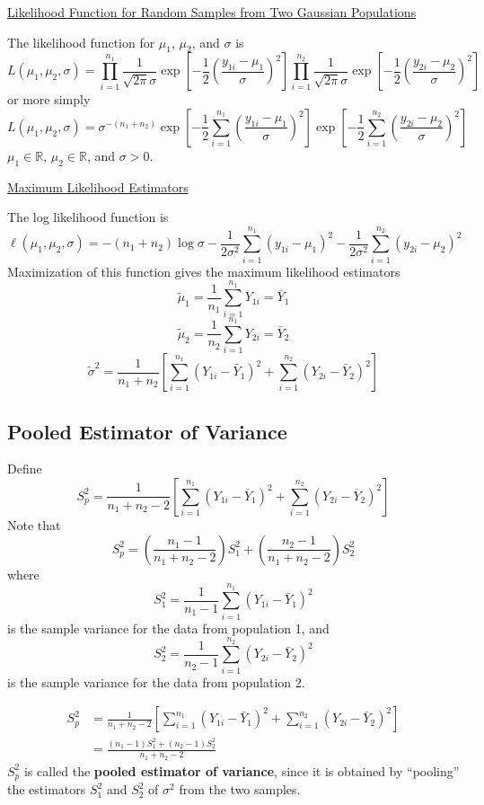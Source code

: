 \underline{Likelihood Function for Random Samples from Two Gaussian Populations}

The likelihood function for $ \mu_1 $, $ \mu_2 $, and $ \sigma $ is
\[L\left(\mu_{1}, \mu_{2}, \sigma\right)=\prod_{i=1}^{n_{1}} \frac{1}{\sqrt{2 \pi} \sigma} \exp \left[-\frac{1}{2}\left(\frac{y_{1 i}-\mu_{1}}{\sigma}\right)^{2}\right] \prod_{i=1}^{n_{2}} \frac{1}{\sqrt{2 \pi} \sigma}
    \exp \left[-\frac{1}{2}\left(\frac{y_{2 i}-\mu_{2}}{\sigma}\right)^{2}\right]\]
or more simply
\[L\left(\mu_{1}, \mu_{2}, \sigma\right)=\sigma^{-\left(n_{1}+n_{2}\right)} \exp \left[-\frac{1}{2} \sum_{i=1}^{n_{1}}\left(\frac{y_{1 i}-\mu_{1}}{\sigma}\right)^{2}\right]
    \exp \left[-\frac{1}{2} \sum_{i=1}^{n_{2}}\left(\frac{y_{2 i}-\mu_{2}}{\sigma}\right)^{2}\right]\]
$ \mu_1\in\mathbb{R} $, $ \mu_2\in\mathbb{R} $, and $ \sigma>0 $.

\underline{Maximum Likelihood Estimators}

The log likelihood function is
\[\ell\left(\mu_{1}, \mu_{2}, \sigma\right)=-\left(n_{1}+n_{2}\right) \log \sigma-\frac{1}{2 \sigma^{2}} \sum_{i=1}^{n_{1}}\left(y_{1 i}-\mu_{1}\right)^{2}
    -\frac{1}{2 \sigma^{2}} \sum_{i=1}^{n_{2}}\left(y_{2 i}-\mu_{2}\right)^{2}\]
Maximization of this function gives the maximum likelihood estimators
\[ \tilde{\mu}_1=\frac{1}{n_1} \sum\limits_{i=1}^{n_1} Y_{1i}=\bar{Y}_1 \]
\[ \tilde{\mu}_2=\frac{1}{n_2} \sum\limits_{i=1}^{n_1} Y_{2i}=\bar{Y}_2 \]
\[ \tilde{\sigma}^2=\frac{1}{n_1+n_2}\left[ \sum\limits_{i=1}^{n_1}
        \left( Y_{1i}-\bar{Y}_1 \right)^2+\sum\limits_{i=1}^{n_2}
        \left( Y_{2i}-\bar{Y}_2 \right)^2 \right]  \]


\subsection{Pooled Estimator of Variance}
Define
\[S_{p}^{2}=\frac{1}{n_{1}+n_{2}-2}\left[\sum_{i=1}^{n_{1}}\left(Y_{1 i}-\bar{Y}_{1}\right)^{2}+\sum_{i=1}^{n_{2}}\left(Y_{2 i}-\bar{Y}_{2}\right)^{2}\right]\]
Note that
\[S_{p}^{2}=\left(\frac{n_{1}-1}{n_{1}+n_{2}-2}\right) S_{1}^{2}+\left(\frac{n_{2}-1}{n_{1}+n_{2}-2}\right) S_{2}^{2}\]
where
\[S_{1}^{2}=\frac{1}{n_{1}-1} \sum_{i=1}^{n_{1}}\left(Y_{1 i}-\bar{Y}_{1}\right)^{2}\]
is the sample variance for the data from population 1, and
\[S_{2}^{2}=\frac{1}{n_{2}-1} \sum_{i=1}^{n_{2}}\left(Y_{2 i}-\bar{Y}_{2}\right)^{2}\]
is the sample variance for the data from population 2.

\begin{Definition}{}{}
    \[\begin{aligned}
            S_{p}^{2} & =\frac{1}{n_{1}+n_{2}-2}\left[\sum_{i=1}^{n_{1}}\left(Y_{1 i}-\bar{Y}_{1}\right)^{2}+\sum_{i=1}^{n_{2}}\left(Y_{2 i}-\bar{Y}_{2}\right)^{2}\right] \\
                      & =\frac{\left(n_{1}-1\right) S_{1}^{2}+\left(n_{2}-1\right) S_{2}^{2}}{n_{1}+n_{2}-2}
        \end{aligned}\]
    $ S_p^2 $ is called the \textbf{pooled estimator of variance}, since it is obtained by
    ``pooling'' the estimators $ S_1^2 $ and $ S_2^2 $ of $ \sigma^2 $ from the two samples.
\end{Definition}

